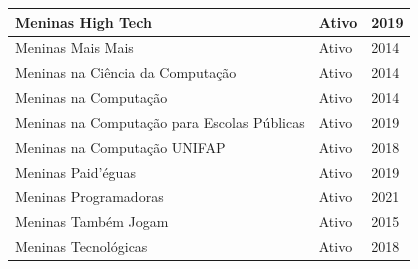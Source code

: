 \begin{longtable}{|l|l|l|}
Meninas High Tech                                                                                                                                           & Ativo                        & 2019                        \\ \hline
Meninas Mais Mais                                                                                                                                           & Ativo                        & 2014                        \\ \hline
Meninas na Ciência da Computação                                                                                                                            & Ativo                        & 2014                        \\ \hline
Meninas na Computação                                                                                                                                       & Ativo                        & 2014                        \\ \hline
Meninas na Computação para Escolas Públicas                                                                                                                 & Ativo                        & 2019                        \\ \hline
Meninas na Computação UNIFAP                                                                                                                                & Ativo                        & 2018                        \\ \hline
  
Meninas Paid’éguas                                                                                                                                          & Ativo                        & 2019                        \\ \hline
  
Meninas Programadoras                                                                                                                                       & Ativo                        & 2021                        \\ \hline
Meninas Também Jogam                                                                                                                                        & Ativo                        & 2015                        \\ \hline
Meninas Tecnológicas                                                                                                                                        & Ativo                        & 2018                        \\ \hline
  

\end{longtable}
